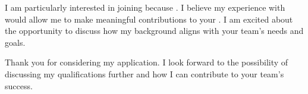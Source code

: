 I am particularly interested in joining \COMPANY because \SPECIFICREASON. I believe my experience with \RELEVANTTECHNOLOGY would allow me to make meaningful contributions to your \TEAMNAME. I am excited about the opportunity to discuss how my background aligns with your team's needs and goals.
\vspace{0.2cm}

Thank you for considering my application. I look forward to the possibility of discussing my qualifications further and how I can contribute to your team's success.
